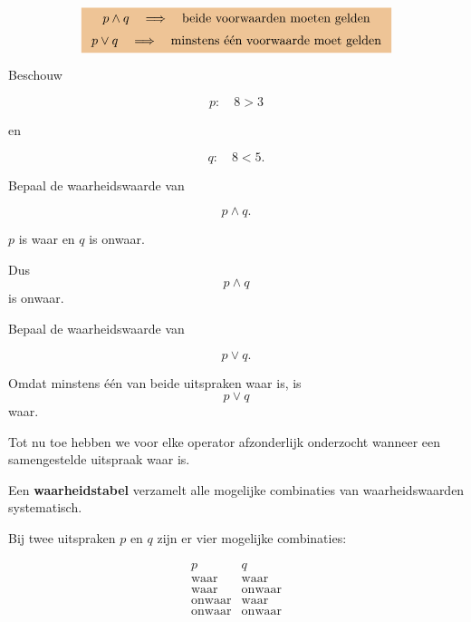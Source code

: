 \documentclass{ximera}
\begin{document}
  \[
  \important{
  \begin{array}{c}
  p\land q
  \quad\Longrightarrow\quad
  \text{beide voorwaarden moeten gelden}\\[2mm]
  p\lor q
  \quad\Longrightarrow\quad
  \text{minstens één voorwaarde moet gelden}
  \end{array}
  }
  \]


  \begin{oefening}[En of of?]{\oefB \ESS}

  Beschouw

  \[
  p:\quad 8>3
  \]

  en

  \[
  q:\quad 8<5.
  \]

  \begin{question}
  Bepaal de waarheidswaarde van

  \[
  p\land q.
  \]

  \begin{oplossing}
  $p$ is waar en $q$ is onwaar.

  Dus
  \[
  p\land q
  \]
  is onwaar.
  \end{oplossing}
  \end{question}


  \begin{question}
  Bepaal de waarheidswaarde van

  \[
  p\lor q.
  \]

  \begin{oplossing}
  Omdat minstens één van beide uitspraken waar is, is
  \[
  p\lor q
  \]
  waar.
  \end{oplossing}
  \end{question}

  \end{oefening}



  Tot nu toe hebben we voor elke operator afzonderlijk onderzocht wanneer
  een samengestelde uitspraak waar is.

  Een \textbf{waarheidstabel} verzamelt alle mogelijke combinaties van
  waarheidswaarden systematisch.


  Bij twee uitspraken $p$ en $q$ zijn er vier mogelijke combinaties:

  \[
  \begin{array}{c|c}
  p & q\\
  \hline
  \text{waar} & \text{waar}\\
  \text{waar} & \text{onwaar}\\
  \text{onwaar} & \text{waar}\\
  \text{onwaar} & \text{onwaar}
  \end{array}
  \]
\end{document}
